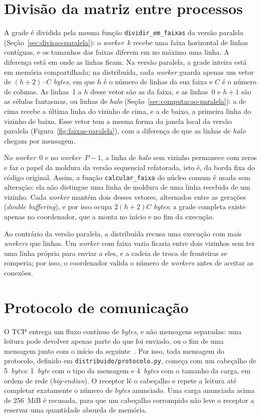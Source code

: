 \section{Divisão da matriz entre processos}\label{sec:divisao-distribuida}

A grade é dividida pela mesma função \texttt{dividir\_em\_faixas} da versão paralela (Seção~\ref{sec:divisao-paralela}): o \textit{worker}~$k$ recebe uma faixa horizontal de linhas contíguas, e os tamanhos das faixas diferem em no máximo uma linha. A diferença está em onde as linhas ficam. Na versão paralela, a grade inteira está em memória compartilhada; na distribuída, cada \textit{worker} guarda apenas um vetor de $(h+2) \cdot C$ \textit{bytes}, em que $h$ é o número de linhas da sua faixa e $C$ é o número de colunas. As linhas~1 a $h$ desse vetor são as da faixa, e as linhas~0 e $h+1$ são as células fantasmas, ou linhas de \textit{halo} (Seção~\ref{sec:computacao-paralela}): a de cima recebe a última linha do vizinho de cima, e a de baixo, a primeira linha do vizinho de baixo. Esse vetor tem a mesma forma da janela local da versão paralela (Figura~\ref{fig:faixas-paralela}), com a diferença de que as linhas de \textit{halo} chegam por mensagem.

No \textit{worker}~0 e no \textit{worker}~$P-1$, a linha de \textit{halo} sem vizinho permanece com zeros e faz o papel da moldura da versão sequencial refatorada, isto é, da borda fixa do código original. Assim, a função \texttt{calcular\_faixa} do núcleo comum é usada sem alteração: ela não distingue uma linha de moldura de uma linha recebida de um vizinho. Cada \textit{worker} mantém dois desses vetores, alternados entre as gerações (\textit{double buffering}), e por isso ocupa $2(h+2)C$ \textit{bytes}; a grade completa existe apenas no coordenador, que a monta no início e no fim da execução.

Ao contrário da versão paralela, a distribuída recusa uma execução com mais \textit{workers} que linhas. Um \textit{worker} com faixa vazia ficaria entre dois vizinhos sem ter uma linha própria para enviar a eles, e a cadeia de troca de fronteiras se romperia; por isso, o coordenador valida o número de \textit{workers} antes de aceitar as conexões.

\section{Protocolo de comunicação}\label{sec:protocolo-distribuida}

O \ac{TCP} entrega um fluxo contínuo de \textit{bytes}, e não mensagens separadas: uma leitura pode devolver apenas parte do que foi enviado, ou o fim de uma mensagem junto com o início da seguinte~\cite{PythonSocket}. Por isso, toda mensagem do protocolo, definido em \texttt{distribuido/protocolo.py}, começa com um cabeçalho de 5~\textit{bytes}: 1~\textit{byte} com o tipo da mensagem e 4~\textit{bytes} com o tamanho da carga, em ordem de rede (\textit{big-endian}). O receptor lê o cabeçalho e repete a leitura até completar exatamente o número de \textit{bytes} anunciado. Uma carga anunciada acima de 256~MiB é recusada, para que um cabeçalho corrompido não leve o receptor a reservar uma quantidade absurda de memória.

